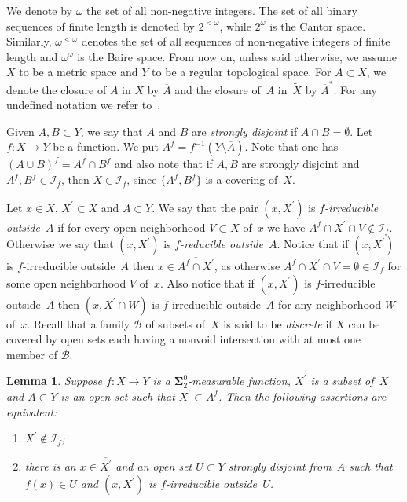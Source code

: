 \documentclass{raex}
\theoremstyle{plain}
\newtheorem{lem}[thm]{Lemma}
\theoremstyle{definition}
\theoremstyle{remark}
\def\B{\mathcal{B}}
\def\S{\mathbf{\Sigma}}
\def\I{\mathcal{I}}
\renewcommand{\theenumi}{\arabic{enumi}}
\renewcommand{\labelenumi}{(\theenumi)}
\begin{document}
\medskip




We denote by $\omega$ the set of all non-negative integers. The set of all binary sequences of finite length is denoted by $2^{<\omega}$, while $2^\omega$ is the Cantor space. Similarly, $\omega^{<\omega}$ denotes the set of all sequences of non-negative integers of finite length and $\omega^\omega$ is the Baire space. From now on, unless said otherwise, we assume $X$ to be a metric space and $Y$ to be a regular topological space. For $A\subset X$, we denote the closure of $A$ in $X$ by $\overline{A}$ and the closure of~$A$ in~$\widetilde{X}$ by $\overline{A}^\ast$. For any undefined notation we refer to~\cite{kechris}.

Given $A,B\subset Y$, we say that $A$ and $B$ are \emph{strongly disjoint} if $\overline{A}\cap\overline{B}=\emptyset$. Let $f \colon X\to Y$ be a function. We put $A^f=f^{-1}(Y\setminus\overline{A})$. Note that one has $(A\cup B)^f=A^f\cap B^f$ and also note that if $A,B$ are strongly disjoint and $A^f,B^f\in\I_f$, then $X\in\I_f$, since $\{A^f,B^f\}$ is a covering of~$X$.

Let $x\in X$, $X^\prime\subset X$ and $A\subset Y$. We say that the pair $(x,X^\prime)$ is \emph{$f$-irreducible outside~$A$} if for every open neighborhood $V\subset X$ of~$x$ we have $A^f\cap X^\prime\cap V\not\in\I_f$. Otherwise we say that $(x,X^\prime)$ is \emph{$f$-reducible outside~$A$}. Notice that if $(x,X^\prime)$ is $f$-irreducible outside~$A$ then $x\in\overline{A^f\cap X^\prime}$, as otherwise $A^f\cap X^\prime\cap V=\emptyset\in\I_f$ for some open neighborhood $V$ of~$x$. Also notice that if $(x,X^\prime)$ is $f$-irreducible outside~$A$ then $(x,X^\prime\cap W)$ is $f$-irreducible outside~$A$ for any neighborhood $W$ of~$x$. Recall that a family $\B$ of subsets of~$X$ is said to be \emph{discrete} if $X$ can be covered by open sets each having a nonvoid intersection with at most one member of $\B$.

\begin{lem}
\label{lem1}
Suppose $f \colon X\to Y$ is a $\S^0_2$-measurable function, $X^\prime$ is a subset of~$X$ and $A\subset Y$ is an open set such that $X^\prime\subset A^f$. Then the following assertions are equivalent:
{
\renewcommand{\labelenumi}{\textnormal{(\roman{enumi})}}
\begin{enumerate}
\item
$X^\prime\not\in\I_f$;
\item
there is an $x\in\overline{X^\prime}$ and an open set $U\subset Y$ strongly disjoint from~$A$ such that $f(x)\in U$ and $(x,X^\prime)$ is $f$-irreducible outside~$U$.
\end{enumerate}
}
\end{lem}
\end{document}
